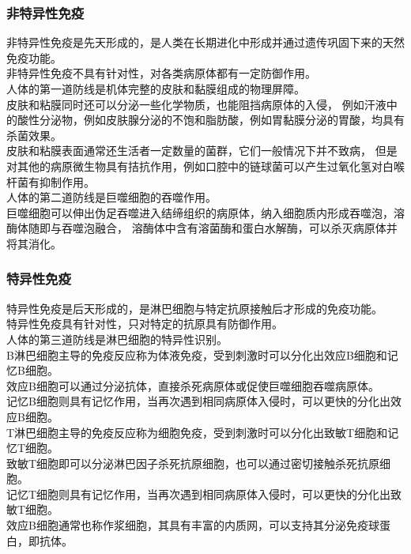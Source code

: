 \documentclass[UTF8]{ctexart}
\begin{document}
\subsubsection{非特异性免疫}
    非特异性免疫是先天形成的，是人类在长期进化中形成并通过遗传巩固下来的天然免疫功能。\\[2mm]
    非特异性免疫不具有针对性，对各类病原体都有一定防御作用。\\[3mm]
    人体的第一道防线是机体完整的皮肤和黏膜组成的物理屏障。\\[3mm]
    皮肤和粘膜同时还可以分泌一些化学物质，也能阻挡病原体的入侵，
    例如汗液中的酸性分泌物，例如皮肤腺分泌的不饱和脂肪酸，例如胃黏膜分泌的胃酸，均具有杀菌效果。\\[3mm]
    皮肤和粘膜表面通常还生活者一定数量的菌群，它们一般情况下并不致病，
    但是对其他的病原微生物具有拮抗作用，例如口腔中的链球菌可以产生过氧化氢对白喉杆菌有抑制作用。\\[3mm]
    人体的第二道防线是巨噬细胞的吞噬作用。\\[3mm]
    巨噬细胞可以伸出伪足吞噬进入结缔组织的病原体，纳入细胞质内形成吞噬泡，溶酶体随即与吞噬泡融合，
    溶酶体中含有溶菌酶和蛋白水解酶，可以杀灭病原体并将其消化。

\subsubsection{特异性免疫}
    特异性免疫是后天形成的，是淋巴细胞与特定抗原接触后才形成的免疫功能。\\[2mm]
    特异性免疫具有针对性，只对特定的抗原具有防御作用。\\[3mm]
    人体的第三道防线是淋巴细胞的特异性识别。\\[4mm]
    B淋巴细胞主导的免疫反应称为体液免疫，受到刺激时可以分化出效应B细胞和记忆B细胞。\\[2mm]
    效应B细胞可以通过分泌抗体，直接杀死病原体或促使巨噬细胞吞噬病原体。\\[2mm]
    记忆B细胞则具有记忆作用，当再次遇到相同病原体入侵时，可以更快的分化出效应B细胞。\\[4mm]
    T淋巴细胞主导的免疫反应称为细胞免疫，受到刺激时可以分化出致敏T细胞和记忆T细胞。\\[2mm]
    致敏T细胞即可以分泌淋巴因子杀死抗原细胞，也可以通过密切接触杀死抗原细胞。\\[2mm]
    记忆T细胞则具有记忆作用，当再次遇到相同病原体入侵时，可以更快的分化出致敏T细胞。\\[4mm]
    效应B细胞通常也称作浆细胞，其具有丰富的内质网，可以支持其分泌免疫球蛋白，即抗体。
\end{document}

